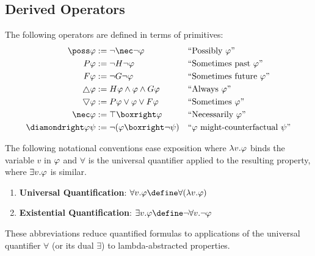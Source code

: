 \documentclass[../LogosReference.tex]{subfiles}
\begin{document}

\subsection{Derived Operators}\label{sec:derived-operators}

\begin{definition}\label{def:derived-operators}
The following operators are defined in terms of primitives:
\begin{align}
    \poss\metaA &:= \neg\nec\neg\metaA && \text{``Possibly $\metaA$''} \\
    \somepast\metaA &:= \neg\allpast\neg\metaA && \text{``Sometimes past $\metaA$''} \\
    \somefuture\metaA &:= \neg\allfuture\neg\metaA && \text{``Sometimes future $\metaA$''} \\
    \always\metaA &:= \allpast\metaA \land \metaA \land \allfuture\metaA && \text{``Always $\metaA$''} \\
    \sometimes\metaA &:= \somepast\metaA \lor \metaA \lor \somefuture\metaA && \text{``Sometimes $\metaA$''} \\
    \nec\metaA &:= \top \boxright \metaA && \text{``Necessarily $\metaA$''} \\
    \diamondright\metaA\metaB &:= \neg(\metaA \boxright \neg\metaB) && \text{``$\metaA$ might-counterfactual $\metaB$''}
\end{align}
\end{definition}


\begin{definition}\label{def:derived-operators}
  The following notational conventions ease exposition where $\lambda v.\varphi$ binds the variable $v$ in $\varphi$ and $\forall$ is the universal quantifier applied to the resulting property, where $\exists v.\varphi$ is similar.
  \begin{enumerate}
    \item \textbf{Universal Quantification}: $\forall v.\metaA \define \forall(\lambda v.\metaA)$
    \item \textbf{Existential Quantification}: $\exists v.\metaA \define \neg \forall v. \neg\metaA$
  \end{enumerate}
  These abbreviations reduce quantified formulas to applications of the universal quantifier $\forall$ (or its dual $\exists$) to lambda-abstracted properties.
\end{definition}
\end{document}
